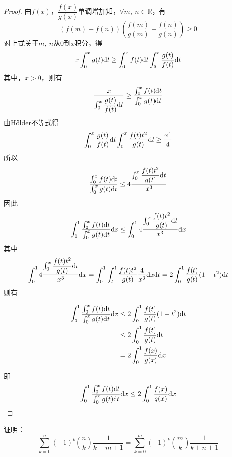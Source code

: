 \begin{proof}
    
    由$f(x)$，$\dfrac{f(x)}{g(x)}$单调增加知，$\forall m,\ n \in \mathbb{R}$，有
    $$(f(m) - f(n))\left(\dfrac{f(m)}{g(m)} - \dfrac{f(n)}{g(n)}\right) \geq 0$$
    对上式关于$m,\ n$从$0$到$x$积分，得
    $$x\int_{0}^{x}{g(t)}\mathrm{d} t \geq \int_{0}^{x}{f(t)}\mathrm{d} t \int_{0}^{x}{\dfrac{g(t)}{f(t)}}\mathrm{d} t$$
    其中，$x > 0$，则有
    $$\dfrac{x}{\int_{0}^{x}{\dfrac{g(t)}{f(t)}}\mathrm{d} t} \geq \dfrac{\int_{0}^{x}{f(t)}\mathrm{d} t}{\int_{0}^{x}{g(t)}\mathrm{d} t}$$
    由\textup{H{\H o}lder}不等式得
    $$\int_{0}^{x}{\dfrac{g(t)}{f(t)}}\mathrm{d} t \int_{0}^{x}{\dfrac{f(t)t^2}{g(t)}}\mathrm{d} t \geq \dfrac{x^4}{4}$$
    所以
    $$\dfrac{\int_{0}^{x}{f(t)}\mathrm{d} t}{\int_{0}^{x}{g(t)}\mathrm{d} t} \leq 4 \dfrac{\int_{0}^{x}{\dfrac{f(t)t^2}{g(t)}}\mathrm{d} t}{x^3}$$
    因此
    $$\int_{0}^{1}{\dfrac{\int_{0}^{x}{f(t)}\mathrm{d} t}{\int_{0}^{x}{g(t)}\mathrm{d} t}}\mathrm{d} x \leq \int_{0}^{1}{4 \dfrac{\int_{0}^{x}{\dfrac{f(t)t^2}{g(t)}}\mathrm{d} t}{x^3}}\mathrm{d} x$$
    其中
    $$\int_{0}^{1}{4 \dfrac{\int_{0}^{x}{\dfrac{f(t)t^2}{g(t)}}\mathrm{d} t}{x^3}}\mathrm{d} x = \int_{0}^{1}{\int_{t}^{1}{\dfrac{f(t)t^2}{g(t)}\dfrac{4}{x^3}}\mathrm{d} x}\mathrm{d} t = 2 \int_{0}^{1}{\dfrac{f(t)}{g(t)}(1 - t^2)}\mathrm{d} t$$
    则有
    
    \begin{align*}
        \int_{0}^{1}{\dfrac{\int_{0}^{x}{f(t)}\mathrm{d} t}{\int_{0}^{x}{g(t)}\mathrm{d} t}}\mathrm{d} x & \leq 2 \int_{0}^{1}{\dfrac{f(t)}{g(t)}(1 - t^2)}\mathrm{d} t \\
        & \leq 2 \int_{0}^{1}{\dfrac{f(t)}{g(t)}}\mathrm{d} t \\
        & = 2 \int_{0}^{1}{\dfrac{f(x)}{g(x)}}\mathrm{d} x
    \end{align*}

    即
    $$\int_{0}^{1}{\dfrac{\int_{0}^{x}{f(t)}\mathrm{d} t}{\int_{0}^{x}{g(t)}\mathrm{d} t}}\mathrm{d} x \leq 2\int_{0}^{1}{\dfrac{f(x)}{g(x)}}\mathrm{d} x$$

\end{proof}

\begin{proposition}

    证明：
    $$\sum\limits_{k = 0}^{n}{(-1)^k \binom{n}{k}\dfrac{1}{k + m + 1}} = \sum\limits_{k = 0}^{m}{(-1)^k \binom{m}{k}\dfrac{1}{k + n + 1}}$$

\end{proposition}

